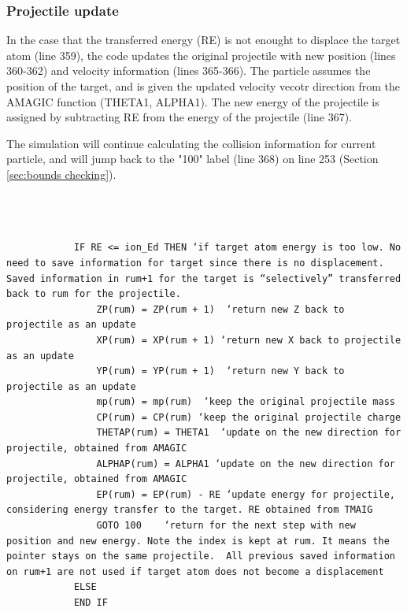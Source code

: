 \documentclass[10pt, reqno]{exam}
\begin{document}
\subsubsection{Projectile update}

In the case that the transferred energy (RE) is not enought to displace the target atom (line 359), the code updates the original projectile with new position (lines 360-362) and velocity information (lines 365-366). The particle assumes the position of the target, and is given the updated velocity vecotr direction from the AMAGIC function (THETA1, ALPHA1). The new energy of the projectile is assigned by subtracting RE from the energy of the projectile (line 367). \par

The simulation will continue calculating the collision information for current particle, and will jump back to the "100" label (line 368) on line 253 (Section \ref{sec:bounds checking}). \par

\begin{verbatim}   

    
    
            IF RE <= ion_Ed THEN ‘if target atom energy is too low. No need to save information for target since there is no displacement. Saved information in rum+1 for the target is “selectively” transferred back to rum for the projectile.  
                ZP(rum) = ZP(rum + 1)  ‘return new Z back to projectile as an update
                XP(rum) = XP(rum + 1) ‘return new X back to projectile as an update
                YP(rum) = YP(rum + 1)  ‘return new Y back to projectile as an update
                mp(rum) = mp(rum)  ‘keep the original projectile mass
                CP(rum) = CP(rum) ‘keep the original projectile charge
                THETAP(rum) = THETA1  ‘update on the new direction for projectile, obtained from AMAGIC
                ALPHAP(rum) = ALPHA1 ‘update on the new direction for projectile, obtained from AMAGIC
                EP(rum) = EP(rum) - RE ‘update energy for projectile, considering energy transfer to the target. RE obtained from TMAIG
                GOTO 100    ‘return for the next step with new position and new energy. Note the index is kept at rum. It means the pointer stays on the same projectile.  All previous saved information on rum+1 are not used if target atom does not become a displacement
            ELSE
            END IF
\end{verbatim}
\end{document}

